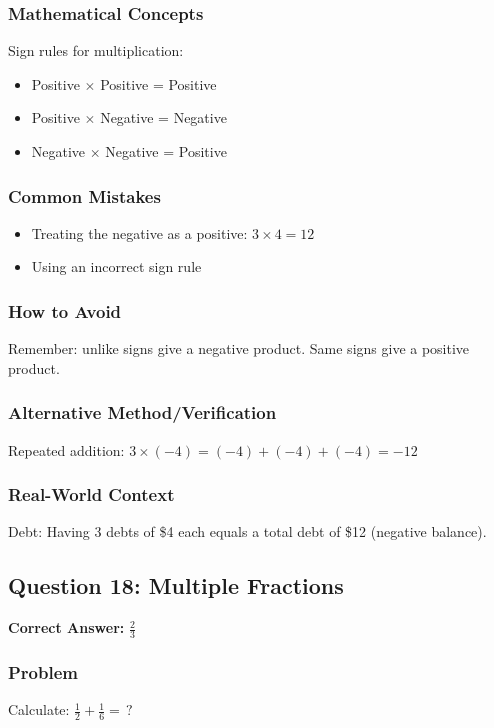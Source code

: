 \documentclass[12pt,a4paper]{article}
\begin{document}
\subsubsection*{Mathematical Concepts}
Sign rules for multiplication:
\begin{itemize}
    \item Positive $\times$ Positive = Positive
    \item Positive $\times$ Negative = Negative
    \item Negative $\times$ Negative = Positive
\end{itemize}

\subsubsection*{Common Mistakes}
\begin{itemize}
    \item Treating the negative as a positive: $3 \times 4 = 12$
    \item Using an incorrect sign rule
\end{itemize}

\subsubsection*{How to Avoid}
Remember: unlike signs give a negative product. Same signs give a positive product.

\subsubsection*{Alternative Method/Verification}
Repeated addition: $3 \times (-4) = (-4) + (-4) + (-4) = -12$ 

\subsubsection*{Real-World Context}
Debt: Having 3 debts of \$4 each equals a total debt of \$12 (negative balance).

\vspace{0.5cm}

\subsection*{Question 18: Multiple Fractions}

\textbf{Correct Answer:} $\frac{2}{3}$

\subsubsection*{Problem}
Calculate: $\frac{1}{2} + \frac{1}{6} = \,?$
\end{document}
